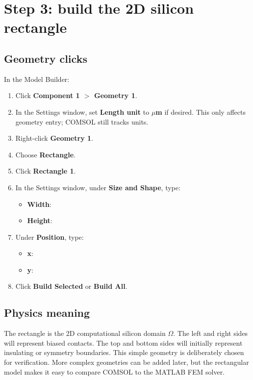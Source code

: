 \documentclass[11pt]{article}
\newcommand{\code}[1]{\texttt{\detokenize{#1}}}
\begin{document}
\section{Step 3: build the 2D silicon rectangle}

\subsection{Geometry clicks}

In the Model Builder:
\begin{enumerate}[leftmargin=2em]
\item Click \textbf{Component 1 $>$ Geometry 1}.
\item In the Settings window, set \textbf{Length unit} to \textbf{$\mu$m} if desired. This only affects geometry entry; COMSOL still tracks units.
\item Right-click \textbf{Geometry 1}.
\item Choose \textbf{Rectangle}.
\item Click \textbf{Rectangle 1}.
\item In the Settings window, under \textbf{Size and Shape}, type:
\begin{itemize}
\item \textbf{Width}: \code{Lx}
\item \textbf{Height}: \code{Ly}
\end{itemize}
\item Under \textbf{Position}, type:
\begin{itemize}
\item \textbf{x}: \code{0}
\item \textbf{y}: \code{0}
\end{itemize}
\item Click \textbf{Build Selected} or \textbf{Build All}.
\end{enumerate}

\subsection{Physics meaning}

The rectangle is the 2D computational silicon domain $\Omega$. The left and right sides will represent biased contacts. The top and bottom sides will initially represent insulating or symmetry boundaries. This simple geometry is deliberately chosen for verification. More complex geometries can be added later, but the rectangular model makes it easy to compare COMSOL to the MATLAB FEM solver.
\end{document}
